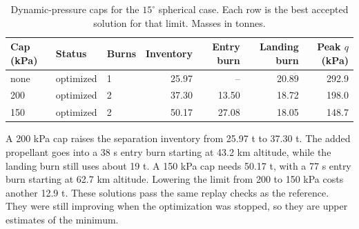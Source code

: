 \begin{table}[htbp]
\centering
\caption{Dynamic-pressure caps for the $15^\circ$ spherical case. Each row is the best accepted solution for that limit. Masses in tonnes.}
\label{tab:qcap}
\begin{tabular}{@{}lllrrrr@{}}
\toprule
Cap (kPa) & Status & Burns & Inventory & Entry burn & Landing burn & Peak $q$ (kPa) \\
\midrule
none & optimized & 1 & 25.97 & -- & 20.89 & 292.9 \\
200 & optimized & 2 & 37.30 & 13.50 & 18.72 & 198.0 \\
150 & optimized & 2 & 50.17 & 27.08 & 18.05 & 148.7 \\
\bottomrule
\end{tabular}
\end{table}

A 200 kPa cap raises the separation inventory from 25.97 t to 37.30 t. The added propellant goes into a 38 s entry burn starting at 43.2 km altitude, while the landing burn still uses about 19 t. A 150 kPa cap needs 50.17 t, with a 77 s entry burn starting at 62.7 km altitude. Lowering the limit from 200 to 150 kPa costs another 12.9 t. These solutions pass the same replay checks as the reference. They were still improving when the optimization was stopped, so they are upper estimates of the minimum.
